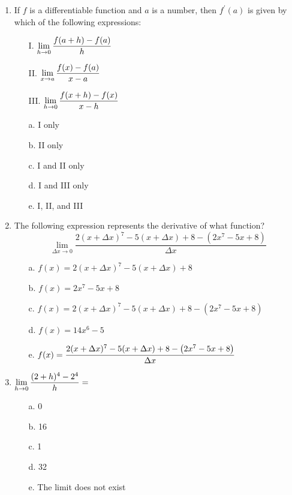 \documentclass[12pt]{report}
\begin{document}
\begin{enumerate}
\item If $f$ is a differentiable function and $a$ is a number, then $f^\prime(a)$ is given by which of the following expressions: \vspace{0.2cm}
\begin{enumerate}
\item [I.] $\displaystyle \lim_{h \to 0}\frac{f(a+h)-f(a)}{h}$ \vspace{0.2cm}
\item [II.] $\displaystyle \lim_{x \to a}\frac{f(x)-f(a)}{x-a}$ \vspace{0.2cm}
\item [III.] $\displaystyle \lim_{h \to 0}\frac{f(x+h)-f(x)}{x-h}$\\
\end{enumerate}
\begin{enumerate}
\item [a.] I only
\item [b.] II only
\item [c.] I and II only
\item [d.] I and III only
\item [e.] I, II, and III
\end{enumerate}

\item  The following expression represents the derivative of what function?\vspace{0.25cm}
\[
\lim_{\Delta x \to 0}\frac{2(x+\Delta x)^7-5(x+\Delta x)+8-\left(2x^7-5x+8\right)}{\Delta x}
\]\vspace{0.25cm}
\begin{enumerate}
\item [a.] $f(x) = 2(x+\Delta x)^7-5(x+\Delta x)+8$ \vspace{0.2cm}
\item [b.] $f(x) = 2x^7-5x+8$ \vspace{0.2cm}
\item [c.] $f(x) = 2(x+\Delta x)^7-5(x+\Delta x)+8-\left(2x^7-5x+8\right)$ \vspace{0.2cm}
\item [d.] $f(x) = 14x^6-5$ \vspace{0.2cm}
\item [e.] $\displaystyle f(x) = \frac{2(x+\Delta x)^7-5(x+\Delta x)+8-\left(2x^7-5x+8\right)}{\Delta x}$
\end{enumerate}

\item$\displaystyle \lim_{h \to 0} \frac{(2+h)^4-2^4}{h}=$ \vspace{0.25cm}
\begin{enumerate}
\item [a.] 0 \vspace{0.2cm}
\item [b.] 16 \vspace{0.2cm}
\item [c.] 1 \vspace{0.2cm}
\item [d.] 32 \vspace{0.2cm}
\item [e.] The limit does not exist
\end{enumerate}


\end{enumerate}
\end{document}
